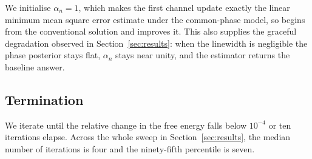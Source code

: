 We initialise $\alpha_n = 1$, which makes the first channel update exactly the
linear minimum mean square error estimate under the common-phase model, so
\est{} begins from the conventional solution and improves it. This also
supplies the graceful degradation observed in Section~\ref{sec:results}: when
the linewidth is negligible the phase posterior stays flat, $\alpha_n$ stays
near unity, and the estimator returns the baseline answer.

\subsection{Termination}

We iterate until the relative change in the free energy falls below $10^{-4}$
or ten iterations elapse. Across the whole sweep in
Section~\ref{sec:results}, the median number of iterations is four and the
ninety-fifth percentile is seven.
